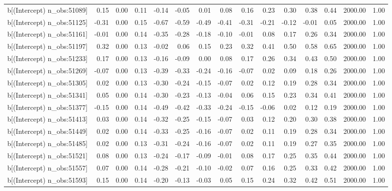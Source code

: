 \begin{table}[ht]
\begin{tabular}{rrrrrrrrrrrrrrr}
  b[(Intercept) n\_obs:51089] & 0.15 & 0.00 & 0.11 & -0.14 & -0.05 & 0.01 & 0.08 & 0.16 & 0.23 & 0.30 & 0.38 & 0.44 & 2000.00 & 1.00 \\ 
  b[(Intercept) n\_obs:51125] & -0.31 & 0.00 & 0.15 & -0.67 & -0.59 & -0.49 & -0.41 & -0.31 & -0.21 & -0.12 & -0.01 & 0.05 & 2000.00 & 1.00 \\ 
  b[(Intercept) n\_obs:51161] & -0.01 & 0.00 & 0.14 & -0.35 & -0.28 & -0.18 & -0.10 & -0.01 & 0.08 & 0.17 & 0.26 & 0.34 & 2000.00 & 1.00 \\ 
  b[(Intercept) n\_obs:51197] & 0.32 & 0.00 & 0.13 & -0.02 & 0.06 & 0.15 & 0.23 & 0.32 & 0.41 & 0.50 & 0.58 & 0.65 & 2000.00 & 1.00 \\ 
  b[(Intercept) n\_obs:51233] & 0.17 & 0.00 & 0.13 & -0.16 & -0.09 & 0.00 & 0.08 & 0.17 & 0.26 & 0.34 & 0.43 & 0.50 & 2000.00 & 1.00 \\ 
  b[(Intercept) n\_obs:51269] & -0.07 & 0.00 & 0.13 & -0.39 & -0.33 & -0.24 & -0.16 & -0.07 & 0.02 & 0.09 & 0.18 & 0.26 & 2000.00 & 1.00 \\ 
  b[(Intercept) n\_obs:51305] & 0.02 & 0.00 & 0.13 & -0.30 & -0.24 & -0.15 & -0.07 & 0.02 & 0.12 & 0.19 & 0.28 & 0.34 & 2000.00 & 1.00 \\ 
  b[(Intercept) n\_obs:51341] & 0.05 & 0.00 & 0.14 & -0.30 & -0.23 & -0.13 & -0.04 & 0.06 & 0.15 & 0.23 & 0.34 & 0.41 & 2000.00 & 1.00 \\ 
  b[(Intercept) n\_obs:51377] & -0.15 & 0.00 & 0.14 & -0.49 & -0.42 & -0.33 & -0.24 & -0.15 & -0.06 & 0.02 & 0.12 & 0.19 & 2000.00 & 1.00 \\ 
  b[(Intercept) n\_obs:51413] & 0.03 & 0.00 & 0.14 & -0.32 & -0.25 & -0.15 & -0.07 & 0.03 & 0.12 & 0.20 & 0.30 & 0.38 & 2000.00 & 1.00 \\ 
  b[(Intercept) n\_obs:51449] & 0.02 & 0.00 & 0.14 & -0.33 & -0.25 & -0.16 & -0.07 & 0.02 & 0.11 & 0.19 & 0.28 & 0.34 & 2000.00 & 1.00 \\ 
  b[(Intercept) n\_obs:51485] & 0.02 & 0.00 & 0.13 & -0.31 & -0.24 & -0.16 & -0.07 & 0.02 & 0.11 & 0.19 & 0.27 & 0.35 & 2000.00 & 1.00 \\ 
  b[(Intercept) n\_obs:51521] & 0.08 & 0.00 & 0.13 & -0.24 & -0.17 & -0.09 & -0.01 & 0.08 & 0.17 & 0.25 & 0.35 & 0.44 & 2000.00 & 1.00 \\ 
  b[(Intercept) n\_obs:51557] & 0.07 & 0.00 & 0.14 & -0.28 & -0.21 & -0.10 & -0.02 & 0.07 & 0.16 & 0.25 & 0.33 & 0.42 & 2000.00 & 1.00 \\ 
  b[(Intercept) n\_obs:51593] & 0.15 & 0.00 & 0.14 & -0.20 & -0.13 & -0.03 & 0.05 & 0.15 & 0.24 & 0.32 & 0.42 & 0.51 & 2000.00 & 1.00 \\ 

\end{tabular}
\end{table}
